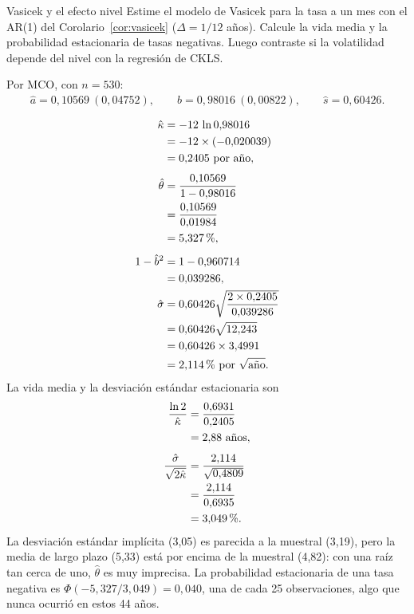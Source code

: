 \begin{ejresuelto}{Vasicek y el efecto nivel}\label{ej:vasicek}
\enunciado Estime el modelo de Vasicek para la tasa a un mes con el AR(1) del Corolario~\ref{cor:vasicek} ($\Delta=1/12$
años). Calcule la vida media y la probabilidad estacionaria de tasas negativas. Luego contraste si la volatilidad depende
del nivel con la regresión de CKLS.

\solucion
{} Por MCO, con $n=530$:
\[
  \hat a=0{,}10569\ (0{,}04752),\qquad \hat b=0{,}98016\ (0{,}00822),\qquad \hat s=0{,}60426 .
\]

\begin{align*}
  \hat\kappa &= -12\,\ln 0{,}98016\\
             &= -12\times(-0{,}020039)\\
             &= 0{,}2405\ \text{por año},\\[4pt]
  \hat\theta &= \frac{0{,}10569}{1-0{,}98016}\\
             &= \frac{0{,}10569}{0{,}01984}\\
             &= 5{,}327\text{\,\%},\\[4pt]
  1-\hat b^2 &= 1-0{,}960714\\
             &= 0{,}039286,\\
  \hat\sigma &= 0{,}60426\sqrt{\frac{2\times0{,}2405}{0{,}039286}}\\
             &= 0{,}60426\sqrt{12{,}243}\\
             &= 0{,}60426\times3{,}4991\\
             &= 2{,}114\text{\,\%}\ \text{por }\sqrt{\text{año}} .
\end{align*}
La vida media y la desviación estándar estacionaria son
\begin{align*}
  \frac{\ln2}{\hat\kappa} &= \frac{0{,}6931}{0{,}2405}\\
                          &= 2{,}88\ \text{años},\\[4pt]
  \frac{\hat\sigma}{\sqrt{2\hat\kappa}} &= \frac{2{,}114}{\sqrt{0{,}4809}}\\
                                         &= \frac{2{,}114}{0{,}6935}\\
                                         &= 3{,}049\text{\,\%}.
\end{align*}
La desviación estándar implícita (3,05) es parecida a la muestral (3,19), pero la media de largo plazo (5,33) está por encima
de la muestral (4,82): con una raíz tan cerca de uno, $\hat\theta$ es muy imprecisa. La probabilidad estacionaria de una tasa
negativa es $\Phi(-5{,}327/3{,}049)=0{,}040$, una de cada 25 observaciones, algo que nunca ocurrió en estos 44 años.


\end{ejresuelto}
